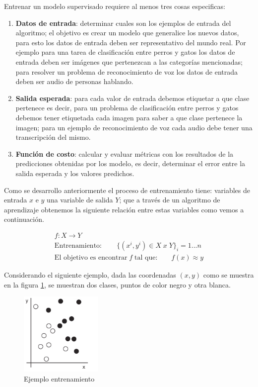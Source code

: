 Entrenar un modelo supervisado requiere al menos tres cosas especificas:
\begin{enumerate}
\item \textbf{Datos de entrada}: determinar cuales son los ejemplos de entrada del algoritmo; el objetivo es crear un modelo que generalice los nuevos datos, para esto los datos de entrada deben ser representativo del mundo real. Por ejemplo para una tarea de clasificación entre perros y gatos los datos de entrada deben ser imágenes que pertenezcan a las categorías mencionadas; para resolver un problema de reconocimiento de voz los datos de entrada deben ser audio de personas hablando.

\item \textbf{Salida esperada}: para cada valor de entrada debemos etiquetar a que clase pertenece es decir, para un problema de clasificación entre perros y gatos debemos tener etiquetada cada imagen para saber a que clase pertenece la imagen; para un ejemplo de reconocimiento de voz cada audio debe tener una transcripción del mismo.

\item \textbf{Función de costo}: calcular y evaluar métricas con los resultados de la predicciones obtenidas por los modelo, es decir, determinar el error entre la salida esperada y los valores predichos.

\end{enumerate}

Como se desarrollo anteriormente el proceso de entrenamiento tiene: variables de entrada $ x$ e  $ y$  una variable de salida $ Y$; que a través de un algoritmo de aprendizaje obtenemos la siguiente relación entre estas variables como vemos a continuación.


\begin{eqnarray}
 f:X \longrightarrow Y\\
 \mbox{Entrenamiento}:\qquad \{(x^i, y^i) \in X\; x\; Y \} _i=1...n\\
 \mbox{El objetivo es encontrar}\; f\; \mbox{tal que:}\qquad f(x)\approx y
\end{eqnarray}

Considerando el siguiente ejemplo, dada las coordenadas $ (x,y)$ como se muestra en la figura \ref{Fig:ejemplo-1}, se muestran dos clases, puntos de color negro y otra blanca.
\begin{figure}[H] \centering
  \includegraphics[height=4cm,keepaspectratio=true,clip=true]{imagenes/MarcoTeorico/sample.png}
  \caption{Ejemplo entrenamiento}\label{Fig:ejemplo-1}
\end{figure}

